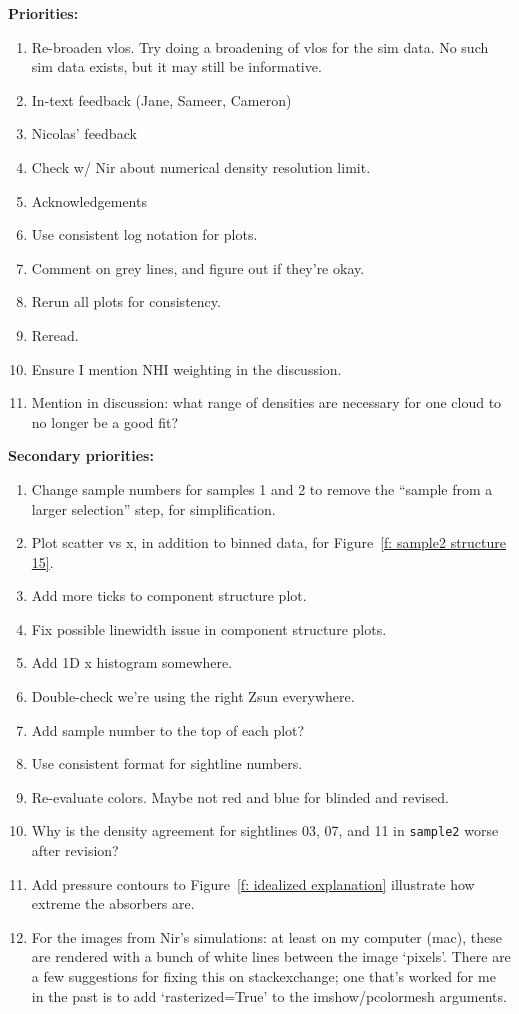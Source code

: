 \documentclass[fleqn,usenatbib]{mnras}
\begin{document}

\textbf{Priorities:}
\begin{enumerate}
    \item Re-broaden vlos. Try doing a broadening of vlos for the sim data. No such sim data exists, but it may still be informative.
    \item In-text feedback (Jane, Sameer, Cameron)
    \item Nicolas' feedback
    \item Check w/ Nir about numerical density resolution limit.
    \item Acknowledgements
    \item Use consistent log notation for plots.
    \item Comment on grey lines, and figure out if they're okay.
    \item Rerun all plots for consistency.
    \item Reread.
    \item Ensure I mention NHI weighting in the discussion.
    \item Mention in discussion: what range of densities are necessary for one cloud to no longer be a good fit?
\end{enumerate}

\textbf{Secondary priorities:}
\begin{enumerate}
    \item Change sample numbers for samples 1 and 2 to remove the ``sample from a larger selection'' step, for simplification.
    \item Plot scatter vs x, in addition to binned data, for Figure~\ref{f: sample2 structure 15}.
    \item Add more ticks to component structure plot.
    \item Fix possible linewidth issue in component structure plots.
    \item Add 1D x histogram somewhere.
    \item Double-check we're using the right Zsun everywhere.
    \item Add sample number to the top of each plot?
    \item Use consistent format for sightline numbers.
    \item Re-evaluate colors. Maybe not red and blue for blinded and revised.
    \item Why is the density agreement for sightlines 03, 07, and 11 in \texttt{sample2} worse after revision?
    \item Add pressure contours to Figure~\ref{f: idealized explanation} illustrate how extreme the absorbers are.
    \item For the images from Nir's simulations: at least on my computer (mac), these are rendered with a bunch of white lines between the image `pixels'. There are a few suggestions for fixing this on stackexchange; one that's worked for me in the past is to add `rasterized=True' to the imshow/pcolormesh arguments. 
\end{enumerate}
\end{document}
